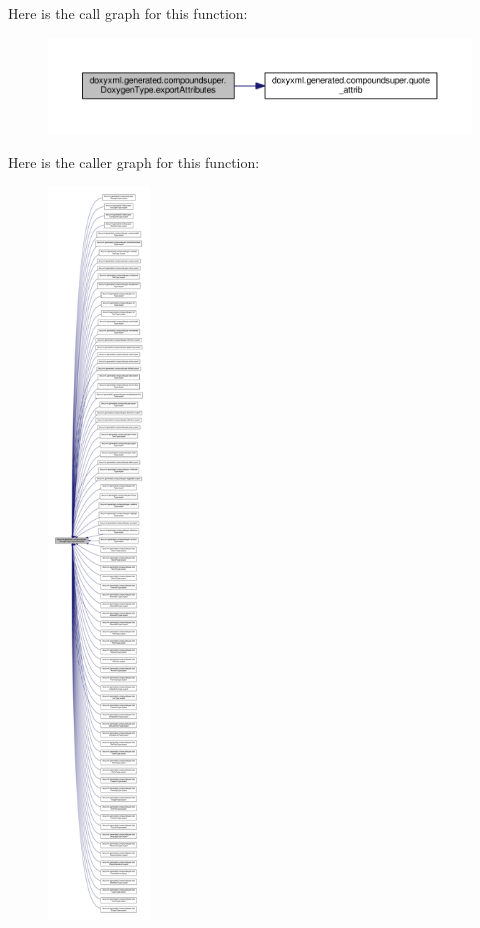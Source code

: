 Here is the call graph for this function\+:
\nopagebreak
\begin{figure}[H]
\begin{center}
\leavevmode
\includegraphics[width=350pt]{d0/d54/classdoxyxml_1_1generated_1_1compoundsuper_1_1DoxygenType_a5f54d67605ddadecd5e482dd5096c018_cgraph}
\end{center}
\end{figure}




Here is the caller graph for this function\+:
\nopagebreak
\begin{figure}[H]
\begin{center}
\leavevmode
\includegraphics[height=550pt]{d0/d54/classdoxyxml_1_1generated_1_1compoundsuper_1_1DoxygenType_a5f54d67605ddadecd5e482dd5096c018_icgraph}
\end{center}
\end{figure}


